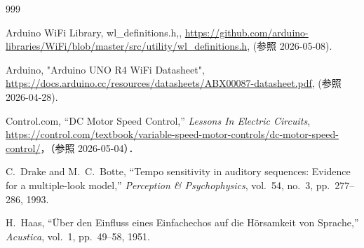 \documentclass[uplatex,dvipdfmx]{jlreq}
\begin{document}
\newpage
\begin{thebibliography}{999}

 Arduino WiFi Library, wl\_definitions.h,, \url{https://github.com/arduino-libraries/WiFi/blob/master/src/utility/wl_definitions.h}, (参照 2026-05-08).

 Arduino, "Arduino UNO R4 WiFi Datasheet", \url{https://docs.arduino.cc/resources/datasheets/ABX00087-datasheet.pdf}, (参照 2026-04-28).

Control.com, ``DC Motor Speed Control,'' {\em Lessons In Electric Circuits}, \\
\url{https://control.com/textbook/variable-speed-motor-controls/dc-motor-speed-control/}，（参照 2026-05-04）．

C.~Drake and M.~C.~Botte,
``Tempo sensitivity in auditory sequences: Evidence for a multiple-look model,''
\textit{Perception \& Psychophysics},
vol.~54,
no.~3,
pp.~277--286,
1993.

H.~Haas,
``\"Uber den Einfluss eines Einfachechos auf die H\"orsamkeit von Sprache,''
\textit{Acustica},
vol.~1,
pp.~49--58,
1951.

\end{thebibliography}
\end{document}
